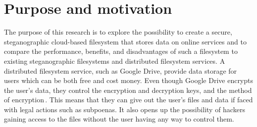 
\section{Purpose and motivation}

The purpose of this research is to explore the possibility to create a secure, steganographic cloud-based filesystem that stores data on online services and to compare the performance, benefits, and disadvantages of such a filesystem to existing steganographic filesystems and distributed filesystem services. A distributed filesystem service, such as Google Drive, provide data storage for users which can be both free and cost money. Even though Google Drive encrypts the user's data, they control the encryption and decryption keys, and the method of encryption\,\cite{johnsonGoogleDriveSecure2021}. This means that they can give out the user's files and data if faced with legal actions such as subpoenas. It also opens up the possibility of hackers gaining access to the files without the user having any way to control them.


